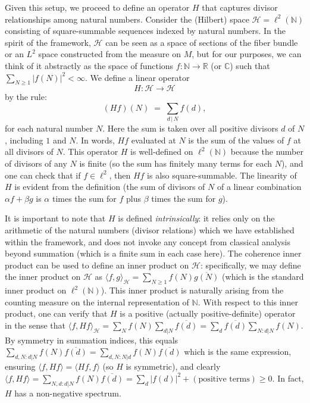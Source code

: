 \documentclass[11pt]{article}
\begin{document}
Given this setup, we proceed to define an operator $H$ that captures divisor relationships among natural numbers. Consider the (Hilbert) space $\mathcal{H} = \ell^2(\mathbb{N})$ consisting of square-summable sequences indexed by natural numbers. In the spirit of the framework, $\mathcal{H}$ can be seen as a space of sections of the fiber bundle or an $L^2$ space constructed from the measure on $M$, but for our purposes, we can think of it abstractly as the space of functions $f: \mathbb{N}\to \mathbb{R}$ (or $\mathbb{C}$) such that $\sum_{N\ge1} |f(N)|^2 < \infty$. We define a linear operator 
\[ H: \mathcal{H} \to \mathcal{H} \] 
by the rule:
\begin{equation}\label{eq:H-def}
 (Hf)(N) \;=\; \sum_{d\,|\,N} f(d),
\end{equation}
for each natural number $N$. Here the sum is taken over all positive divisors $d$ of $N$, including $1$ and $N$. In words, $Hf$ evaluated at $N$ is the sum of the values of $f$ at all divisors of $N$. This operator $H$ is well-defined on $\ell^2(\mathbb{N})$ because the number of divisors of any $N$ is finite (so the sum has finitely many terms for each $N$), and one can check that if $f\in \ell^2$, then $Hf$ is also square-summable. The linearity of $H$ is evident from the definition (the sum of divisors of $N$ of a linear combination $\alpha f + \beta g$ is $\alpha$ times the sum for $f$ plus $\beta$ times the sum for $g$).

It is important to note that $H$ is defined \emph{intrinsically}: it relies only on the arithmetic of the natural numbers (divisor relations) which we have established within the framework, and does not invoke any concept from classical analysis beyond summation (which is a finite sum in each case here). The coherence inner product can be used to define an inner product on $\mathcal{H}$: specifically, we may define the inner product on $\mathcal{H}$ as $\langle f, g\rangle_{\mathcal{H}} = \sum_{N\ge1} f(N)\overline{g(N)}$ (which is the standard inner product on $\ell^2(\mathbb{N})$). This inner product is naturally arising from the counting measure on the internal representation of $\mathbb{N}$. With respect to this inner product, one can verify that $H$ is a positive (actually positive-definite) operator in the sense that $\langle f, Hf\rangle_{\mathcal{H}} = \sum_{N} f(N) \sum_{d|N} \overline{f(d)} = \sum_{d} \overline{f(d)} \sum_{N: d|N} f(N)$. By symmetry in summation indices, this equals $\sum_{d,N: d|N} f(N)\overline{f(d)} = \sum_{d,N: N|d} f(N)\overline{f(d)}$ which is the same expression, ensuring $\langle f, Hf\rangle = \langle Hf, f\rangle$ (so $H$ is symmetric), and clearly $\langle f, Hf\rangle = \sum_{N,d: d|N} f(N)\overline{f(d)} = \sum_{d} |f(d)|^2 + (\text{positive terms}) \ge 0$. In fact, $H$ has a non-negative spectrum.
\end{document}
